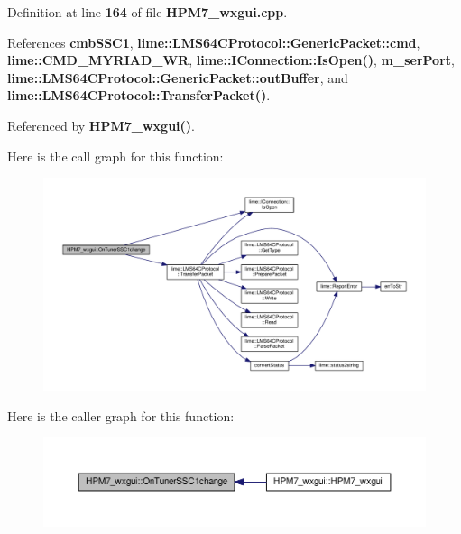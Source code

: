 Definition at line {\bf 164} of file {\bf H\+P\+M7\+\_\+wxgui.\+cpp}.



References {\bf cmb\+S\+S\+C1}, {\bf lime\+::\+L\+M\+S64\+C\+Protocol\+::\+Generic\+Packet\+::cmd}, {\bf lime\+::\+C\+M\+D\+\_\+\+M\+Y\+R\+I\+A\+D\+\_\+\+WR}, {\bf lime\+::\+I\+Connection\+::\+Is\+Open()}, {\bf m\+\_\+ser\+Port}, {\bf lime\+::\+L\+M\+S64\+C\+Protocol\+::\+Generic\+Packet\+::out\+Buffer}, and {\bf lime\+::\+L\+M\+S64\+C\+Protocol\+::\+Transfer\+Packet()}.



Referenced by {\bf H\+P\+M7\+\_\+wxgui()}.



Here is the call graph for this function\+:
\nopagebreak
\begin{figure}[H]
\begin{center}
\leavevmode
\includegraphics[width=350pt]{de/dd7/classHPM7__wxgui_a69215882fb2f728eb6bd310418f1d296_cgraph}
\end{center}
\end{figure}




Here is the caller graph for this function\+:
\nopagebreak
\begin{figure}[H]
\begin{center}
\leavevmode
\includegraphics[width=350pt]{de/dd7/classHPM7__wxgui_a69215882fb2f728eb6bd310418f1d296_icgraph}
\end{center}
\end{figure}



